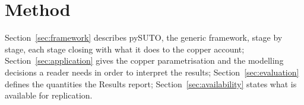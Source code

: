 %

\section{Method}\label{sec:method}

Section~\ref{sec:framework} describes pySUTO, the generic framework, stage by
stage, each stage closing with what it does to the copper account;
Section~\ref{sec:application} gives the copper parametrisation and the
modelling decisions a reader needs in order to interpret the results;
Section~\ref{sec:evaluation} defines the quantities the Results report;
Section~\ref{sec:availability} states what is available for replication.


